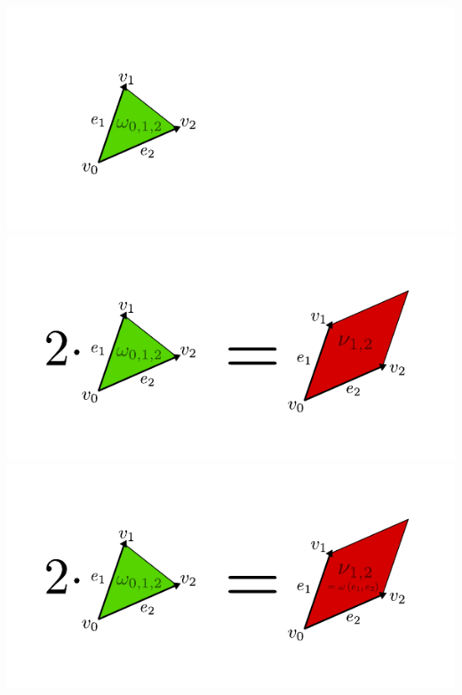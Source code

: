 \documentclass[compress]{beamer}
\begin{document}
\begin{frame}
  \begin{center}
    \begin{overprint}
      \includegraphics[scale=1.0]{../img/conditions/10.pdf}
      \includegraphics[scale=1.0]{../img/conditions/11.pdf}
      \includegraphics[scale=1.0]{../img/conditions/12.pdf}
    \end{overprint}
  \end{center}
\end{frame}
\end{document}
